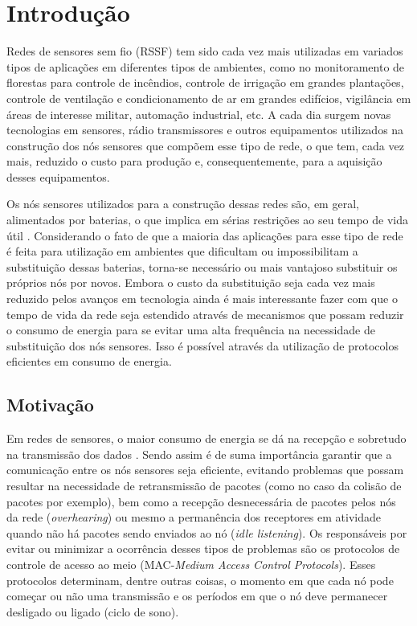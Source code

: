 \section{Introdução}

Redes de sensores sem fio (RSSF) tem sido cada vez mais utilizadas em variados tipos de aplicações em diferentes tipos de ambientes, como no monitoramento de florestas para controle de incêndios, controle de irrigação em grandes plantações, controle de ventilação e condicionamento de ar em grandes edifícios, vigilância em áreas de interesse militar, automação industrial, etc. A cada dia surgem novas tecnologias em sensores, rádio transmissores e outros equipamentos utilizados na construção dos nós sensores que compõem esse tipo de rede, o que tem, cada vez mais, reduzido o custo para produção e, consequentemente, para a aquisição desses equipamentos.

Os nós sensores utilizados para a construção dessas redes são, em geral, alimentados por baterias, o que implica em sérias restrições ao seu tempo de vida útil \cite{Akyildiz2002a}. Considerando o fato de que a maioria das aplicações para esse tipo de rede é feita para utilização em ambientes que dificultam ou impossibilitam a substituição dessas baterias, torna-se necessário ou mais vantajoso substituir os próprios nós por novos. Embora o custo da substituição seja cada vez mais reduzido pelos avanços em tecnologia ainda é mais interessante fazer com que o tempo de vida da rede seja estendido através de mecanismos que possam reduzir o consumo de energia para se evitar uma alta frequência na necessidade de substituição dos nós sensores. Isso é possível através da utilização de protocolos eficientes em consumo de energia. 

\subsection{Motivação}

Em redes de sensores, o maior consumo de energia se dá na recepção e sobretudo na transmissão dos dados \cite{Halkes:2005}. Sendo assim é de suma importância garantir que a comunicação entre os nós sensores seja eficiente, evitando problemas que possam resultar na necessidade de retransmissão de pacotes (como no caso da colisão de pacotes por exemplo), bem como a recepção desnecessária de pacotes pelos nós da rede (\emph{overhearing}) ou mesmo a permanência dos receptores em atividade quando não há pacotes sendo enviados ao nó (\emph{idle listening}). Os responsáveis por evitar ou minimizar a ocorrência desses tipos de problemas são os protocolos de controle de acesso ao meio (MAC-\emph{Medium Access Control Protocols}). Esses protocolos determinam, dentre outras coisas, o momento em que cada nó pode começar ou não uma transmissão e os períodos em que o nó deve permanecer desligado ou ligado (ciclo de sono).

